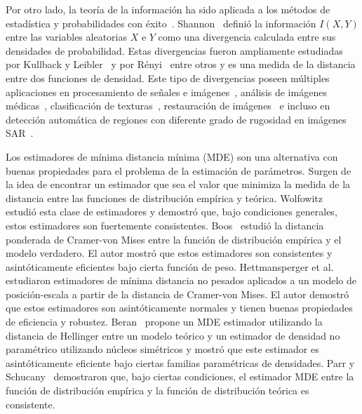 Por otro lado, la teoría de la información ha sido aplicada a los métodos de estadística y probabilidades con éxito~\cite{Liese2006}. 
Shannon~\cite{Shannon1948} definió la información $I(X,Y)$ entre las variables aleatorias $X$ e $Y$ como una divergencia calculada entre sus densidades de probabilidad. 
Estas divergencias fueron ampliamente estudiadas por Kullback y Leibler~\cite{KullbackLeibler1951} y por Rényi~\cite{renyi1961} entre otros y es una medida de la distancia entre dos funciones de densidad. 
Este tipo de divergencias poseen múltiples aplicaciones en procesamiento de señales e imágenes~\cite{4218961}, análisis de imágenes médicas~\cite{5599869},
clasificación de texturas~\cite{1246862}, restauración de imágenes~\cite{1224731} e incluso en detección automática de regiones con diferente grado de rugosidad en imágenes SAR~\cite{6377288,ClassificationPolSARSegmentsMinimizationWishartDistances}.


Los estimadores de mínima distancia mínima (MDE) son una  alternativa con buenas propiedades para el problema de la estimación de parámetros.
Surgen de la idea de encontrar un estimador que sea el valor que minimiza la medida de la distancia entre las funciones de distribución empírica y teórica.
Wolfowitz~\cite{wolfowitz1953, wolfowitz1957} estudió esta clase de estimadores y demostró que, bajo condiciones generales, estos estimadores son fuertemente consistentes. 
Boos~\cite{Boos1981} estudió la distancia ponderada de Cramer-von Mises entre la función de distribución empírica y el modelo verdadero.
El autor mostró que estos estimadores son consistentes y asintóticamente eficientes bajo cierta función de peso.
Hettmansperger et al.~\cite{HettmanSperger1994} estudiaron estimadores de mínima distancia no pesados aplicados a un modelo de posición-escala a partir de la distancia de Cramer-von Mises. El autor demostró que estos estimadores son asintóticamente normales y tienen buenas propiedades de eficiencia y robustez.
Beran~\cite{beran1977} propone un MDE estimador utilizando la distancia de Hellinger entre un modelo teórico y un estimador de densidad no paramétrico utilizando núcleos simétricos y mostró que este estimador es asintóticamente eficiente bajo ciertas familias paramétricas de densidades.
Parr y Schucany~\cite{parr1982} demostraron que, bajo ciertas condiciones, el estimador MDE entre la función de distribución empírica y la función de distribución teórica es consistente.

